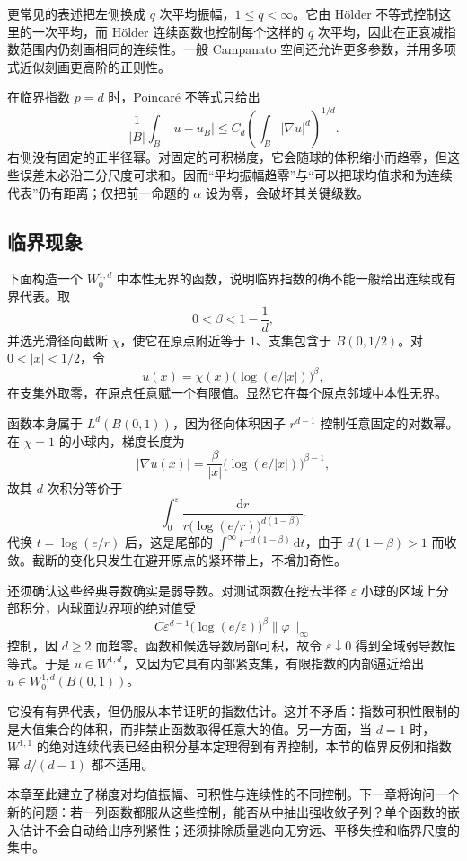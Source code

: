 更常见的表述把左侧换成 \(q\) 次平均振幅，\(1\le q<\infty\)。它由 Hölder 不等式控制这里的一次平均，而 Hölder 连续函数也控制每个这样的 \(q\) 次平均，因此在正衰减指数范围内仍刻画相同的连续性。一般 Campanato 空间还允许更多参数，并用多项式近似刻画更高阶的正则性。

\ProseParagraphBreak

在临界指数 \(p=d\) 时，Poincaré 不等式只给出
\[
 \frac1{|B|}\int_B|u-u_B|
 \le C_d\left(\int_B|\nabla u|^d\right)^{1/d}.
\]
右侧没有固定的正半径幂。对固定的可积梯度，它会随球的体积缩小而趋零，但这些误差未必沿二分尺度可求和。因而“平均振幅趋零”与“可以把球均值求和为连续代表”仍有距离；仅把前一命题的 \(\alpha\) 设为零，会破坏其关键级数。

\subsection{临界现象}
\label{b1:subsec:240504}

下面构造一个 \(W_0^{1,d}\) 中本性无界的函数，说明临界指数的确不能一般给出连续或有界代表。取
\[
 0<\beta<1-\frac1d,
\]
并选光滑径向截断 \(\chi\)，使它在原点附近等于 \(1\)、支集包含于 \(B(0,1/2)\)。对 \(0<|x|<1/2\)，令
\[
 u(x)=\chi(x)\bigl(\log(e/|x|)\bigr)^\beta,
\]
在支集外取零，在原点任意赋一个有限值。显然它在每个原点邻域中本性无界。

\ProseParagraphBreak

函数本身属于 \(L^d(B(0,1))\)，因为径向体积因子 \(r^{d-1}\) 控制任意固定的对数幂。在 \(\chi=1\) 的小球内，梯度长度为
\[
 |\nabla u(x)|
 =\frac{\beta}{|x|}
       \bigl(\log(e/|x|)\bigr)^{\beta-1},
\]
故其 \(d\) 次积分等价于
\[
 \int_0^\varepsilon
      \frac{\mathrm dr}
           {r\bigl(\log(e/r)\bigr)^{d(1-\beta)}}.
\]
代换 \(t=\log(e/r)\) 后，这是尾部的
\(\int^\infty t^{-d(1-\beta)}\,\mathrm dt\)，由于 \(d(1-\beta)>1\) 而收敛。截断的变化只发生在避开原点的紧环带上，不增加奇性。

\ProseParagraphBreak

还须确认这些经典导数确实是弱导数。对测试函数在挖去半径 \(\varepsilon\) 小球的区域上分部积分，内球面边界项的绝对值受
\[
 C\varepsilon^{d-1}
       \bigl(\log(e/\varepsilon)\bigr)^\beta
       \|\varphi\|_\infty
\]
控制，因 \(d\ge2\) 而趋零。函数和候选导数局部可积，故令 \(\varepsilon\downarrow0\) 得到全域弱导数恒等式。于是 \(u\in W^{1,d}\)，又因为它具有内部紧支集，有限指数的内部逼近给出 \(u\in W_0^{1,d}(B(0,1))\)。

\ProseParagraphBreak

它没有有界代表，但仍服从本节证明的指数估计。这并不矛盾：指数可积性限制的是大值集合的体积，而非禁止函数取得任意大的值。另一方面，当 \(d=1\) 时，\(W^{1,1}\) 的绝对连续代表已经由积分基本定理得到有界控制，本节的临界反例和指数幂 \(d/(d-1)\) 都不适用。

\ProseParagraphBreak

本章至此建立了梯度对均值振幅、可积性与连续性的不同控制。下一章将询问一个新的问题：若一列函数都服从这些控制，能否从中抽出强收敛子列？单个函数的嵌入估计不会自动给出序列紧性；还须排除质量逃向无穷远、平移失控和临界尺度的集中。
